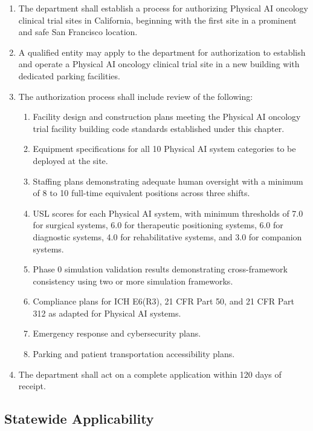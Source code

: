 \documentclass[11pt,letterpaper]{article}
\begin{document}
\begin{enumerate}[label=(\alph*)]
\item The department shall establish a process for authorizing Physical AI
  oncology clinical trial sites in California, beginning with the first site
  in a prominent and safe San Francisco location.

\item A qualified entity may apply to the department for authorization to
  establish and operate a Physical AI oncology clinical trial site in a new
  building with dedicated parking facilities.

\item The authorization process shall include review of the following:
  \begin{enumerate}[label=(\arabic*)]
  \item Facility design and construction plans meeting the Physical AI
    oncology trial facility building code standards established under
    this chapter.
  \item Equipment specifications for all 10 Physical AI system categories
    to be deployed at the site.
  \item Staffing plans demonstrating adequate human oversight with a minimum
    of 8 to 10 full-time equivalent positions across three shifts.
  \item USL scores for each Physical AI system, with minimum thresholds of
    7.0 for surgical systems, 6.0 for therapeutic positioning systems, 6.0 for
    diagnostic systems, 4.0 for rehabilitative systems, and 3.0 for companion
    systems.
  \item Phase 0 simulation validation results demonstrating cross-framework
    consistency using two or more simulation frameworks.
  \item Compliance plans for ICH E6(R3), 21 CFR Part 50, and 21 CFR Part 312
    as adapted for Physical AI systems.
  \item Emergency response and cybersecurity plans.
  \item Parking and patient transportation accessibility plans.
  \end{enumerate}

\item The department shall act on a complete application within 120 days of
  receipt.
\end{enumerate}

\subsection{Statewide Applicability}
\end{document}
